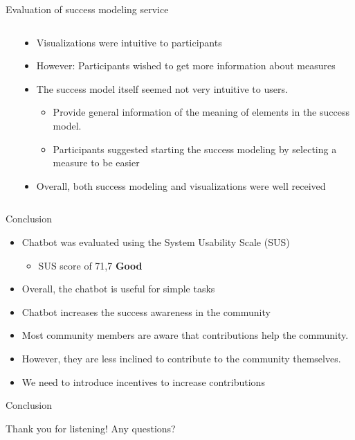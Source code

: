 \begin{frame}{Evaluation of success modeling service}
  \begin{columns}
    \begin{column}[t]{0.5\textwidth}
      
    \end{column}
    \begin{column}[t]{0.5\textwidth}
      \begin{itemize}
        \item Visualizations were intuitive to participants
        \item However: Participants wished to get more information about measures
        \item The success model itself seemed not very intuitive to users.
        \begin{itemize}
          \item Provide general information of the meaning of elements in the success model.
          \item Participants suggested starting the success modeling by selecting a measure to be easier 
        \end{itemize}
        \item Overall, both success modeling and visualizations were well received
      \end{itemize}
    \end{column}
  \end{columns}
\end{frame}

\begin{frame}{Conclusion}
  \begin{itemize}
    \item Chatbot was evaluated using the System Usability Scale (SUS)
    \begin{itemize}
      \item SUS score of 71,7 \textbf{Good}
    \end{itemize}
    \item Overall, the chatbot is useful for simple tasks
    \item Chatbot increases the success awareness in the community
    \item Most community members are aware that contributions help the community.
    \item However, they are less inclined to contribute to the community themselves.
    \item We need to introduce incentives to increase contributions
  \end{itemize}
\end{frame}

\begin{frame}{Conclusion}
  \Huge{\centerline{Thank you for listening! Any questions?}}
\end{frame}


